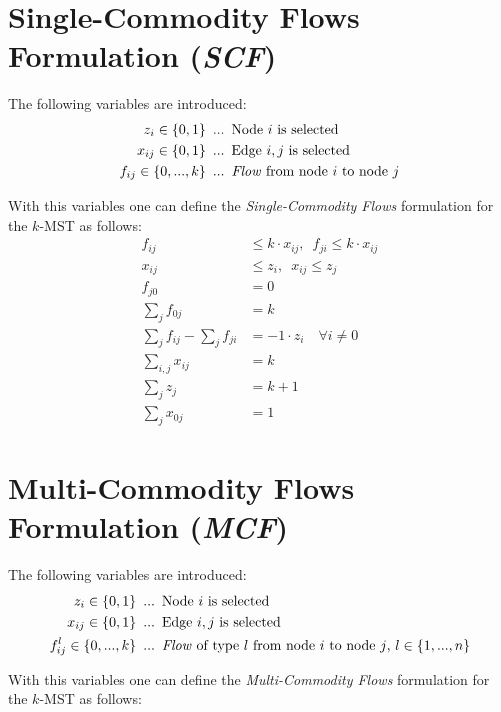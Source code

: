 \documentclass[11pt, oneside, a4paper, fleqn]{article}
\begin{document}
\section*{Single-Commodity Flows Formulation (\emph{SCF})}

The following variables are introduced:
\begin{align*}
  z_i \in\{0,1\} & \enskip ... \enskip \text{Node $i$ is selected}\\
  x_{ij} \in\{0,1\} & \enskip ... \enskip\text{Edge $i,j$ is selected}\\
  f_{ij} \in\{0,...,k\} & \enskip ... \enskip\text{\emph{Flow} from node $i$ to node $j$}
\end{align*}

With this variables one can define the \emph{Single-Commodity Flows}
formulation for the $k$-MST as follows:
\begin{align}
  f_{ij} & \le k\cdot x_{ij}, \enspace f_{ji} \le k\cdot x_{ij}\\
  x_{ij} & \le z_i, \enspace x_{ij} \le z_j \\
  f_{j0} & = 0 \\
  \sum_{j}f_{0j} & = k \\
  \sum_{j}f_{ij} - \sum_{j}f_{ji} & = -1\cdot z_i\quad \forall i \ne 0 \\
  \sum_{i,j}x_{ij} & = k \\
  \sum_{j} z_j & = k + 1 \\
  \sum_{j} x_{0j} & = 1
\end{align}

\section*{Multi-Commodity Flows Formulation (\emph{MCF})}

The following variables are introduced:
\begin{align*}
  z_i \in\{0,1\} & \enskip ... \enskip \text{Node $i$ is selected}\\
  x_{ij} \in\{0,1\} & \enskip ... \enskip\text{Edge $i,j$ is selected}\\
  f^l_{ij} \in\{0,...,k\} & \enskip ... \enskip\text{\emph{Flow}
             of type $l$ from node $i$ to node $j$,
             $l \in \{1, ..., n\}$}
\end{align*}

With this variables one can define the \emph{Multi-Commodity Flows}
formulation for the $k$-MST as follows:
\end{document}
